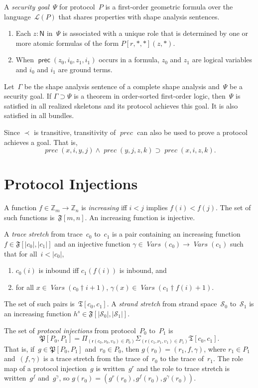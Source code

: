 \documentclass[12pt]{article}
\newcommand{\cn}[1]{\ensuremath{\operatorname{\mathsf{#1}}}}
\newcommand{\fn}[1]{\ensuremath{\operatorname{\mathit{#1}}}}
\newcommand{\srt}[1]{\ensuremath{\mathsf{#1}}}
\newcommand{\typ}{\mathbin:}
\newcommand{\vars}{\fn{Vars}}
\newcommand{\prefix}[2]{#1\dagger#2}
\newcommand{\zed}{\ensuremath{\mathbb{Z}}}
\newcommand{\dprod}[1]{\Pi_{(#1)}}
\newcommand{\dpair}[1]{\Sigma_{(#1)}}
\newcommand{\alg}[1]{\ensuremath{\mathfrak{#1}}}
\newcommand{\ssp}{\ensuremath{\mathcal{S}}}
\newcommand{\lang}{\mathcal{L}}
\newcommand{\role}{\mathsf{r}}
\begin{document}
A \emph{security goal}~$\Psi$ for protocol~$P$ is a first-order
geometric formula over the language~$\lang(P)$ that shares properties
with shape analysis sentences.
\begin{enumerate}
\item Each $z\typ\srt{N}$ in~$\Psi$ is associated with a unique role
  that is determined by one or more atomic formulas of the form
  $P[r,\ast,\ast](z,\ast)$.
\item When $\cn{prec}(z_0,i_0,z_1,i_1)$ occurs in a formula, $z_0$ and
  $z_1$ are logical variables and $i_0$ and $i_1$ are ground terms.
\end{enumerate}

Let~$\Gamma$ be the shape analysis sentence of a complete shape
analysis and~$\Psi$ be a security goal.  If $\Gamma\supset\Psi$ is a
theorem in order-sorted first-order logic, then~$\Psi$ is satisfied in
all realized skeletons and its protocol achieves this goal.  It is
also satisfied in all bundles.

Since $\prec$ is transitive, transitivity of \fn{prec} can also be
used to prove a protocol achieves a goal.  That is,
\[\fn{prec}(x,i,y,j)
\land\fn{prec}(y,j,z,k)\supset
\fn{prec}(x,i,z,k).\]

\section{Protocol Injections}\label{sec:protocol injections}

A function $f\in\zed_m\to\zed_n$ is \emph{increasing} iff $i<j$
implies $f(i)<f(j)$.  The set of such functions is~$\alg{F}[m,n]$.  An
increasing function is injective.

A \emph{trace stretch} from trace~$c_0$ to~$c_1$ is a pair containing
an increasing function $f\in\alg{F}[|c_0|, |c_1|]$ and an injective
function $\gamma\in\vars(c_0)\to\vars(c_1)$ such that for
all~$i<|c_0|$, 
\begin{enumerate}
\item $c_0(i)$ is inbound iff $c_1(f(i))$ is inbound, and
\item for all $x\in\vars(\prefix{c_0}{i+1})$,
  $\gamma(x)\in\vars(\prefix{c_1}{f(i)+1})$.
\end{enumerate}
The set of such pairs is~$\alg{T}[c_0,c_1]$.  A \emph{strand stretch}
from strand space~$\ssp_0$ to~$\ssp_1$ is an increasing function
$h^s\in\alg{F}[|\ssp_0|, |\ssp_1|]$.

The set of \emph{protocol injections} from protocol~$P_0$ to~$P_1$ is
\[\alg{P}[P_0,P_1]=\dprod{\role(c_0,\nu_0,\upsilon_0)\in
  P_0}\dpair{\role(c_1,\nu_1,\upsilon_1)\in P_1}\alg{T}[c_0,c_1].\]
That is, if~$g\in\alg{P}[P_0,P_1]$ and~$r_0\in P_0$, then
$g(r_0)=(r_1,f,\gamma)$, where $r_1\in P_1$ and~$(f,\gamma)$ is a
trace stretch from the trace of~$r_0$ to the trace of~$r_1$.  The role
map of a protocol injection~$g$ is written~$g^r$ and the role to trace
stretch is written~$g^f$ and~$g^\gamma$, so $g(r_0)=(g^r(r_0),
g^f(r_0),g^\gamma(r_0))$.
\end{document}
